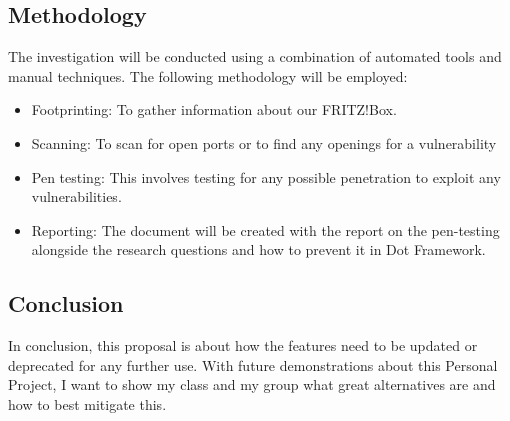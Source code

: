 \documentclass[12pt, letterpaper]{article}
\begin{document}
\subsection{Methodology}
The investigation will be conducted using a combination of automated tools and manual techniques. The following methodology will be employed:
\begin{itemize}
    \item Footprinting: To gather information about our FRITZ!Box.
    \item Scanning: To scan for open ports or to find any openings for a vulnerability
    \item Pen testing: This involves testing for any possible penetration to exploit any vulnerabilities.
    \item Reporting: The document will be created with the report on the pen-testing alongside the research questions and how to prevent it in Dot Framework.
\end{itemize}
\subsection{Conclusion}
In conclusion, this proposal is about how the features need to be updated or deprecated for any further use. With future demonstrations about this Personal Project, I want to show my class and my group what great alternatives are and how to best mitigate this.
\end{document}
